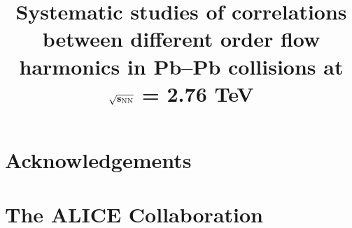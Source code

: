 \documentclass[ALICE,manyauthors]{cernphprep}
\begin{document}
%
%
\newcommand{\PbPb}{\textnormal{Pb--Pb}}
\newcommand{\AuAu}{\textnormal{Au--Au}}
\newcommand{\tn}[1]{\textnormal{#1}}
\newcommand{\snn}{\ensuremath{\sqrt{s_\tn{NN}}}}
\newcommand{\chisqndf}{\chi^2/N_{\rm dof}}
\newcommand{\CKBNOTE}[1]{{\bf CKB:  #1}} 
\renewcommand{\CKBNOTE}[1]{}  %

\newcommand{\RHNOTE}[1]{{\bf RH:  #1}} 
\renewcommand{\RHNOTE}[1]{}  %
\newcommand{\multfigsize}{0.95}
\begin{titlepage}
%
%
%
\title{Systematic studies of correlations between different order flow harmonics in Pb--Pb collisions at $\mathbf{\sqrt{s_{\rm NN}}}$ = 2.76 TeV}

%
%
\begin{abstract}

\end{abstract}
\end{titlepage}
\setcounter{page}{2}


\newenvironment{acknowledgement}{\relax}{\relax}
\begin{acknowledgement}
\section*{Acknowledgements}
\end{acknowledgement}
%
%
%
%




\newpage
%

%
\section{The ALICE Collaboration}
\label{app:collab}
%
\end{document}
